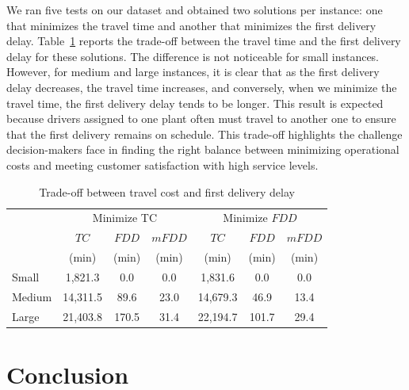 \documentclass{article}
\begin{document}
We ran five tests on our dataset and obtained two solutions per instance: one that minimizes the travel time and another that minimizes the first delivery delay. Table~\ref{tab:cdp_tradeoff} reports the trade-off between the travel time and the first delivery delay for these solutions. The difference is not noticeable for small instances. However, for medium and large instances, it is clear that as the first delivery delay decreases, the travel time increases, and conversely, when we minimize the travel time, the first delivery delay tends to be longer. This result is expected because drivers assigned to one plant often must travel to another one to ensure that the first delivery remains on schedule. This trade-off highlights the challenge decision-makers face in finding the right balance between minimizing operational costs and meeting customer satisfaction with high service levels.

\begin{table}[!ht]
    \centering
    \caption{Trade-off between travel cost and first delivery delay}
    \label{tab:cdp_tradeoff}
    \begin{adjustbox}{max width=0.8\textwidth}
    \begin{tabular}{lcccccc}
    \toprule
     & \multicolumn{3}{c}{Minimize TC} & \multicolumn{3}{c}{Minimize $FDD$} \\
     \cmidrule(l){2-4} \cmidrule(l){5-7}
     & $TC$ & $FDD$ & $mFDD$ & $TC$ & $FDD$ & $mFDD$ \\
     & (min) & (min) & (min) & (min) & (min) & (min) \\
    \midrule
    Small & 1,821.3 & 0.0 & 0.0 & 1,831.6 & 0.0 & 0.0 \\
    Medium & 14,311.5 & 89.6 & 23.0 & 14,679.3 & 46.9 & 13.4 \\
    Large & 21,403.8 & 170.5 & 31.4 & 22,194.7 & 101.7 & 29.4 \\
    \bottomrule
    \end{tabular}
\end{adjustbox}
    
\end{table}

\section{Conclusion}
\label{sec:cdp_concl}
\end{document}
